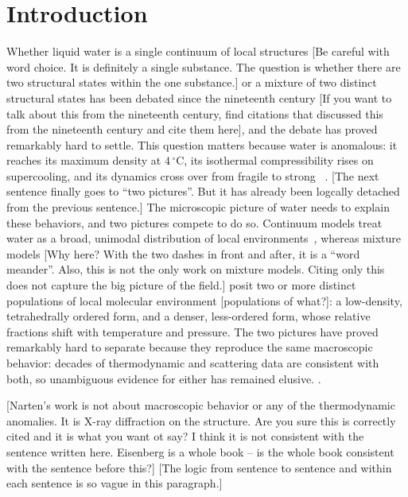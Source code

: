 \documentclass[aps, amsmath,amssymb, reprint, twocolumn, superscriptaddress]{revtex4-2}
\newcommand{\comment}[1]{\textcolor{Mahogany}{#1}}
\begin{document}

\section{Introduction}

Whether liquid water is a single continuum of local structures \comment{[Be careful with word choice. It is definitely a single substance. The question is whether there are two structural states within the one substance.]} or a mixture of two distinct structural states has been debated since the nineteenth century \cite{whiting-1883, rontgen-1892} \comment{[If you want to talk about this from the nineteenth century, find citations that discussed this from the nineteenth century and cite them here]}, and the debate has proved remarkably hard to settle. This question matters because water is anomalous: it reaches its maximum density at $4\,^\circ$C, its
isothermal compressibility rises on supercooling, and its dynamics cross
over from fragile to strong ~\cite{gallo_water_2016}. \comment{[The next sentence finally goes to ``two pictures''. But it has already been logcally detached from the previous sentence.]} The microscopic picture of water needs to explain these behaviors, and two pictures compete to do so. Continuum models treat water as a broad, unimodal distribution of local environments~\cite{eisenberg_structure_2005}, whereas mixture models\cite{whiting-1883,rontgen-1892,wernet-2004, huang-2009, russo_understanding_2014} \comment{[Why here? With the two dashes in front and after, it is a ``word meander''. Also, this is not the only work on mixture models. Citing only this does not capture the big picture of the field.]} posit two or more distinct populations of local molecular environment \comment{[populations of what?]}: a low-density, tetrahedrally ordered form, and a denser, less-ordered form, whose relative fractions shift with temperature and pressure. The two pictures have proved remarkably hard to separate because they reproduce the same macroscopic behavior: decades of thermodynamic and scattering data are consistent with both, so unambiguous evidence for either has remained elusive. \cite{gallo_water_2016, handle_supercooled_2017}. 

\comment{[Narten's work is not about macroscopic behavior or any of the thermodynamic anomalies. It is X-ray diffraction on the structure. Are you sure this is correctly cited and it is what you want ot say? I think it is not consistent with the sentence written here. Eisenberg is a whole book -- is the whole book consistent with the sentence before this?]}
\comment{[The logic from sentence to sentence and within each sentence is so vague in this paragraph.]}
\end{document}
